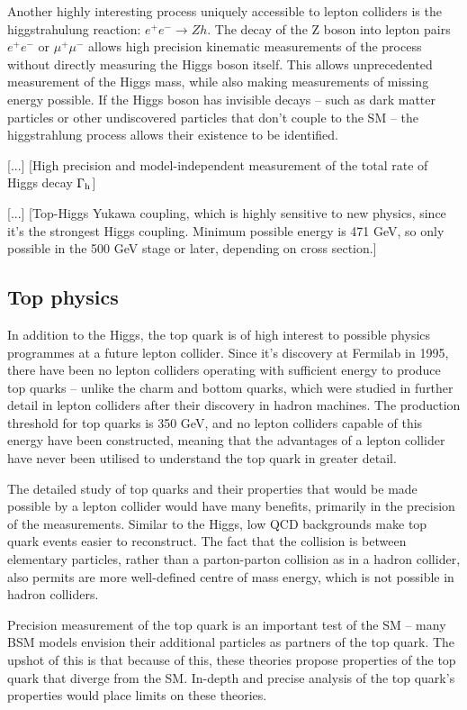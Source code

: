 Another highly interesting process uniquely accessible to lepton colliders is the higgstrahulung reaction: $e^+ e^- \rightarrow Zh$. The decay of the Z boson into lepton pairs $e^+ e^-$ or $\mu^+ \mu^-$ allows high precision kinematic measurements of the process without directly measuring the Higgs boson itself. This allows unprecedented measurement of the Higgs mass, while also making measurements of missing energy possible. If the Higgs boson has invisible decays -- such as dark matter particles or other undiscovered particles that don't couple to the \acrshort{SM} -- the higgstrahlung process allows their existence to be identified.

[...] [High precision and model-independent measurement of the total rate of Higgs decay $\Gamma\textsubscript{h}$]

[...] [Top-Higgs Yukawa coupling, which is highly sensitive to new physics, since it's the strongest Higgs coupling. Minimum possible energy is 471 GeV, so only possible in the 500 GeV stage or later, depending on cross section.]

\subsection{Top physics}
In addition to the Higgs, the top quark is of high interest to possible physics programmes at a future lepton collider. Since it's discovery at Fermilab in 1995, there have been no lepton colliders operating with sufficient energy to produce top quarks -- unlike the charm and bottom quarks, which were studied in further detail in lepton colliders after their discovery in hadron machines. The production threshold for top quarks is 350 GeV, and no lepton colliders capable of this energy have been constructed, meaning that the advantages of a lepton collider have never been utilised to understand the top quark in greater detail. 

The detailed study of top quarks and their properties that would be made possible by a lepton collider would have many benefits, primarily in the precision of the measurements. Similar to the Higgs, low \acrshort{QCD} backgrounds make top quark events easier to reconstruct. The fact that the collision is between elementary particles, rather than a parton-parton collision as in a hadron collider, also permits are more well-defined centre of mass energy, which is not possible in hadron colliders.

Precision measurement of the top quark is an important test of the \acrshort{SM} -- many \acrshort{BSM} models envision their additional particles as partners of the top quark. The upshot of this is that because of this, these theories propose properties of the top quark that diverge from the SM. In-depth and precise analysis of the top quark's properties would place limits on these theories.


